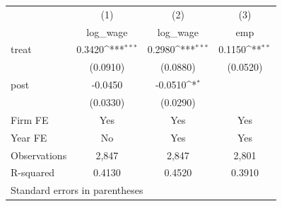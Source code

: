 {
\def\sym#1{\ifmmode^{#1}\else\(^{#1}\)\fi}
\begin{tabular}{l*{3}{c}}
\toprule
                    &\multicolumn{1}{c}{(1)}&\multicolumn{1}{c}{(2)}&\multicolumn{1}{c}{(3)}\\
                    &\multicolumn{1}{c}{log\_wage}&\multicolumn{1}{c}{log\_wage}&\multicolumn{1}{c}{emp}\\
\midrule
treat               &      0.3420\sym{***}&      0.2980\sym{***}&      0.1150\sym{**} \\
                    &    (0.0910)         &    (0.0880)         &    (0.0520)         \\
\addlinespace
post                &     -0.0450         &     -0.0510\sym{*}  &                     \\
                    &    (0.0330)         &    (0.0290)         &                     \\
\midrule
Firm FE             &         Yes         &         Yes         &         Yes         \\
Year FE             &          No         &         Yes         &         Yes         \\
Observations        &       2,847         &       2,847         &       2,801         \\
R-squared           &      0.4130         &      0.4520         &      0.3910         \\
\bottomrule
\multicolumn{4}{l}{\footnotesize Standard errors in parentheses}\\
\end{tabular}
}
